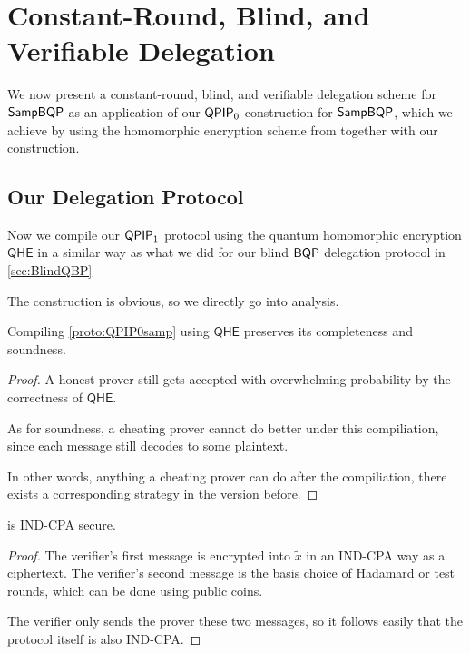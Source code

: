 \section{Constant-Round, Blind, and Verifiable Delegation}

We now present a constant-round, blind, and verifiable delegation scheme for $\operatorname{\mathsf{SampBQP}}$ as an application of our $\operatorname{\mathsf{QPIP}}_0$ construction for $\operatorname{\mathsf{SampBQP}}$,
which we achieve by using the homomorphic encryption scheme from \cite{mahadev_qfhe} together with our construction.

\subsection{Our Delegation Protocol}

Now we compile our $\operatorname{\mathsf{QPIP}}_1$ protocol  using the quantum homomorphic encryption $\mathsf{QHE}$  in a similar way as what we did for our blind $\operatorname{\mathsf{BQP}}$ delegation protocol in \cref{sec:BlindQBP}

The construction is obvious,  so we directly go into analysis. 

\begin{thm}
	Compiling \cref{proto:QPIP0samp} using $\mathsf{QHE}$ preserves its completeness and soundness.
\end{thm}
\begin{proof}
	A honest prover still gets accepted with overwhelming probability by the correctness of $\mathsf{QHE}$. 

	As for soundness, a cheating prover cannot do better under this compiliation, since each message still decodes to some plaintext.

	In other words, anything a cheating prover can do after the compiliation, there exists a corresponding strategy in the version before.
\end{proof}

\begin{thm}
	 is IND-CPA secure.
\end{thm}
\begin{proof}
	The verifier's first message is encrypted into $\tilde{x}$ in an IND-CPA way as a ciphertext.
	The verifier's second message is the basis choice of Hadamard or test rounds, which can be done using public coins.

	The verifier only sends the prover these two messages, so it follows  easily that the protocol itself is also IND-CPA. 
\end{proof}
